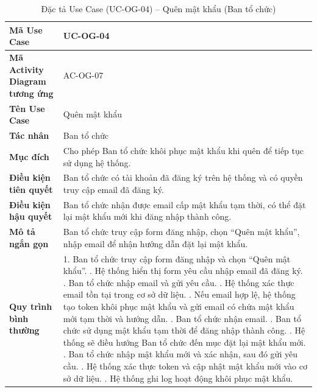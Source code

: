 \renewcommand{\arraystretch}{1.3}
\setlength{\tabcolsep}{4pt}
\begin{longtable}{|p{}|p{}|}
\caption{Đặc tả Use Case (UC-OG-04) -- Quên mật khẩu (Ban tổ chức) }\label{tab:uc_forgot_password}\\
\hline
\textbf{Mã Use Case} & UC-OG-04 \\ \hline
\textbf{Mã Activity Diagram tương ứng} & AC-OG-07 \\ \hline
\textbf{Tên Use Case} & Quên mật khẩu \\ \hline
\textbf{Tác nhân} & Ban tổ chức \\ \hline
\textbf{Mục đích} & Cho phép Ban tổ chức khôi phục mật khẩu khi quên để tiếp tục sử dụng hệ thống. \\ \hline
\textbf{Điều kiện tiên quyết} & Ban tổ chức có tài khoản đã đăng ký trên hệ thống và có quyền truy cập email đã đăng ký. \\ \hline
\textbf{Điều kiện hậu quyết} & Ban tổ chức nhận được email cấp mật khẩu tạm thời, có thể đặt lại mật khẩu mới khi đăng nhập thành công. \\ \hline
\textbf{Mô tả ngắn gọn} & Ban tổ chức truy cập form đăng nhập, chọn “Quên mật khẩu”, nhập email để nhận hướng dẫn đặt lại mật khẩu. \\ \hline
\textbf{Quy trình bình thường} &   
1. Ban tổ chức truy cập form đăng nhập và chọn “Quên mật khẩu”. \newline
2. Hệ thống hiển thị form yêu cầu nhập email đã đăng ký. \newline
3. Ban tổ chức nhập email và gửi yêu cầu. \newline
4. Hệ thống xác thực email tồn tại trong cơ sở dữ liệu. \newline    
5. Nếu email hợp lệ, hệ thống tạo token khôi phục mật khẩu và gửi email có chứa mật khẩu mới tạm thời và hướng dẫn. \newline
6. Ban tổ chức nhận email. \newline
7. Ban tổ chức sử dụng mật khẩu tạm thời để đăng nhập thành công. \newline
8. Hệ thống sẽ điều hướng Ban tổ chức đến mục đặt lại mật khẩu mới. \newline
9. Ban tổ chức nhập mật khẩu mới và xác nhận, sau đó gửi yêu cầu. \newline
10. Hệ thống xác thực token và cập nhật mật khẩu mới vào cơ sở dữ liệu. \newline
11. Hệ thống ghi log hoạt động khôi phục mật khẩu. \newline

\end{longtable}
